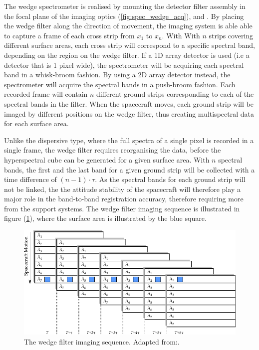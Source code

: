 The wedge spectrometer is realised by mounting the detector filter assembly in the focal plane of the imaging optics (\ref{fig:spec_wedge_acq}), \cite{joseph2015building} and \cite{nieke1997a}. By placing the wedge filter along the direction of movement, the imaging system is able able to capture a frame of each cross strip from $x_1$ to $x_n$. With With $n$ strips covering different surface areas, each cross strip will correspond to a specific spectral band, depending on the region on the wedge filter. If a 1D array detector is used (i.e a detector that is 1 pixel wide), the spectrometer will be acquiring each spectral band in a whisk-broom fashion. By using a 2D array detector instead, the spectrometer will acquire the spectral bands in a push-broom fashion. Each recorded frame will contain $n$ different ground strips corresponding to each of the spectral bands in the filter. When the spacecraft moves, each ground strip will be imaged by different positions on the wedge filter, thus creating multispectral data for each surface area.

Unlike the dispersive type, where the full spectra of a single pixel is recorded in a single frame, the wedge filter requires reorganising the data, before the hyperspectral cube can be generated for a given surface area. With $n$ spectral bands, the first and the last band for a given ground strip will be collected with a time difference of $(n-1)\cdot \tau$. As the spectral bands for each ground strip will not be linked, the the attitude stability of the spacecraft will therefore play a major role in the band-to-band registration accuracy\cite{joseph2015building}, therefore requiring more from the support systems. The wedge filter imaging sequence is illustrated in figure (\ref{fig:wedge_filt_img_sequence}), where the surface area is illustrated by the blue square.

\begin{figure}[htb!]
\centering
\includegraphics[width=\textwidth]{figures/Orbiter/wedge_filt_img_sequence.pdf}
\caption{The wedge filter imaging sequence. Adapted from:\cite{joseph2015building}.}
\label{fig:wedge_filt_img_sequence}
\end{figure}

